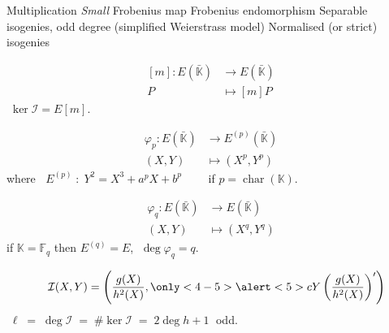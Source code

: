 \documentclass[10pt]{beamer}
\newcommand{\clot}[1]{\bar{#1}}  %
\newcommand{\card}[1]{\# #1}  %
\DeclareMathOperator{\car}{char}  %
\newcommand{\K}{\mathbb{K}}  %
\newcommand{\F}{\mathbb{F}}  %
\newcommand{\frob}{\varphi}  %
\newcommand{\0}{\mathcal{O}}  %
\newcommand{\isog}[1]{\mathcal{#1}}  %
\newcommand{\I}{\isog{I}}  %
\begin{document}
\begin{frame}
  \begin{block}{
	\begin{overprint}
	 Multiplication	
	\onslide<2> \emph{Small} Frobenius map
	\onslide<3> Frobenius endomorphism
	\onslide<4> Separable isogenies, odd degree (simplified Weierstrass model)
	\onslide<5-6> Normalised (or strict) isogenies
	\end{overprint}
	}
    \begin{overprint}
      \[\begin{aligned}
	{}[m] : E(\clot{\K}) &\rightarrow E(\clot{\K})\\
	                   P &\mapsto [m]P
      \end{aligned}\]
      $\;\ker\I = E[m]$.

      \[\begin{aligned}
	\frob_p : E(\clot{\K}) &\rightarrow E^{(p)}(\clot{\K})\\
	                   (X,Y) &\mapsto (X^p,Y^p)
      \end{aligned}\]
      where $\;\;E^{(p)} \;:\; Y^2 = X^3 + a^pX + b^p\qquad$ if $p =
      \car(\K)$.
 
      \[\begin{aligned}
	\frob_q : E(\clot{\K}) &\rightarrow E(\clot{\K})\\
	                   (X,Y) &\mapsto (X^q,Y^q)
      \end{aligned}\]
      if $\K = \F_q$ then $E^{(q)} = E$, $\;\deg \frob_q = q$.

      \[\quad\I(X,Y) = \left(\frac{g(X)}{h^2(X)},
      \only<4-5>{\alert<5>{c}}Y\left(\frac{g(X)}{h^2(X)}\right)'\right)\]
      $\;\ell\;=\;\deg\I\;=\;
      \card{\ker\I} \;=\; 2\deg h + 1\;$ odd.
    \end{overprint}
  \end{block}
\end{frame}

\end{document}
